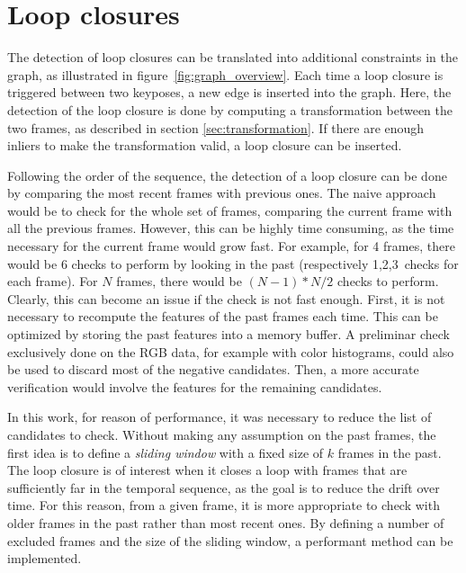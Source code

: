 \section{Loop closures}

The detection of loop closures can be translated into additional constraints in the graph, as illustrated in figure~\ref{fig:graph_overview}. Each time a loop closure is triggered between two keyposes, a new edge is inserted into the graph. Here, the detection of the loop closure is done by computing a transformation between the two frames, as described in section \ref{sec:transformation}. If there are enough inliers to make the transformation valid, a loop closure can be inserted.

Following the order of the sequence, the detection of a loop closure can be done by comparing the most recent frames with previous ones. The naive approach would be to check for the whole set of frames, comparing the current frame with all the previous frames. However, this can be highly time consuming, as the time necessary for the current frame would grow fast. For example, for 4 frames, there would be 6 checks to perform by looking in the past (respectively 1,2,3~checks for each frame). For $N$ frames, there would be $(N-1)*N/2$ checks to perform. Clearly, this can become an issue if the check is not fast enough. First, it is not necessary to recompute the features of the past frames each time. This can be optimized by storing the past features into a memory buffer. A preliminar check exclusively done on the RGB data, for example with color histograms, could also be used to discard most of the negative candidates. Then, a more accurate verification would involve the features for the remaining candidates.

In this work, for reason of performance, it was necessary to reduce the list of candidates to check. Without making any assumption on the past frames, the first idea is  to define a \emph{sliding window} with a fixed size of $k$ frames in the past. The loop closure is of interest when it closes a loop with frames that are sufficiently far in the temporal sequence, as the goal is to reduce the drift over time. For this reason, from a given frame, it is more  appropriate to check with older frames in the past rather than most recent ones. By defining a number of excluded frames and the size of the sliding window, a performant method can be implemented.

